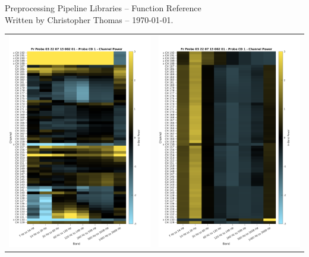 \documentclass[letterpaper,11pt]{report}
\begin{document}
%
%
\pagestyle{empty}

\begin{center}
%
\vspace*{1in}
{\LARGE Preprocessing Pipeline Libraries -- Function Reference} \\
{\footnotesize Written by Christopher Thomas -- \today.}
%
\vspace*{1in}\\
\begin{tabular}{cc}
\includegraphics[width=3in]{plots/0713-prCD1-inband-normchan} &
\includegraphics[width=3in]{plots/0713-prCD1-inband-normband} \\
\end{tabular}
%
\end{center}
%
\vfill
{\tiny }
%
\clearpage
%
%
%
%
\pagestyle{plain}
\setcounter{page}{1}
%

\clearpage
%
\tableofcontents
\clearpage
%
%
%
\pagestyle{plain}
\setcounter{page}{1}
%
\end{document}
